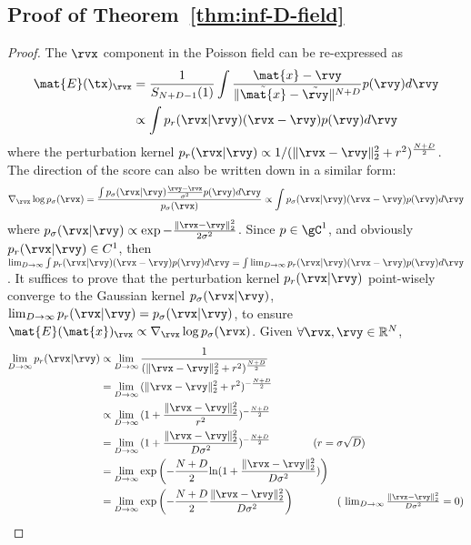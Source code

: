 \subsection{Proof of Theorem~\ref{thm:inf-D-field}}
\label{app:proof-thmfield}
\thmfield*
\begin{proof}
The $\rvx$ component in the Poisson field can be re-expressed as
\begin{align*}
    \mat{E}({\tx})_{\rvx} &= \frac{1}{S_{N+D-1}(1)}\int \frac{{\mat{x}}-{\rvy}}{\|\tilde{\mat{x}}-\tilde{\rvy}\|^{N+D}}{p}({\rvy}) d {\rvy} \\
    &\propto \int p_r(\rvx|\rvy)(\rvx-\rvy)p(\rvy)d\rvy
\end{align*}
 where the perturbation kernel $p_r({\rvx}|\rvy)  \propto  {1}/{({\|\rvx-{\rvy}\|_2^2+ r^2})^\frac{N+D}{2}}$. The direction of the score can also be written down in a similar form: 
 \begin{align*}
     \nabla_\rvx \log p_{\sigma}(\rvx)=\frac{\int p_\sigma(\rvx|\rvy)\frac{\rvy-\rvx}{\sigma^2}p(\rvy)d\rvy}{p_\sigma(\rvx)}\propto \int p_\sigma(\rvx|\rvy)(\rvx-\rvy)p(\rvy)d\rvy
 \end{align*}
where $ p_{\sigma}(\rvx|\rvy) \propto \exp-\frac{\|\rvx-{\rvy}\|_2^2}{ 2\sigma^2}$. Since $p\in \gC^1$, and obviously $p_r(\rvx|\rvy) \in C^1$, then $\lim_{D\to \infty}\int p_r(\rvx|\rvy)(\rvx-\rvy)p(\rvy)d\rvy=\int \lim_{D\to \infty}p_r(\rvx|\rvy)(\rvx-\rvy)p(\rvy)d\rvy$. It suffices to prove that the perturbation kernel $p_r({\rvx}|\rvy)$ point-wisely converge to the Gaussian kernel $p_{\sigma}(\rvx|\rvy)$, \ie $\lim_{D\to \infty}p_r({\rvx}|\rvy) = p_\sigma({\rvx}|\rvy) $, to ensure $\mat{E}({\mat{x}})_{\rvx} \propto \nabla_\rvx \log p_{\sigma}(\rvx)$. Given $\forall \rvx,\rvy \in \mathbb{R}^{N}$, 
\begin{align*}
    \lim_{D\to \infty}p_r({\rvx}|\rvy) &\propto \lim_{D\to \infty}\frac{1}{({\|\rvx-\rvy\|_2^2+ r^2})^\frac{N+D}{2}}\\
    &=\lim_{D\to \infty}{({\|\rvx-\rvy\|_2^2+ r^2})^{-\frac{N+D}{2}}}\\
    &\propto\lim_{D\to \infty}{({1+\frac{\|\rvx-\rvy\|_2^2}{ r^2}})^{-\frac{N+D}{2}}}\\
    &=\lim_{D\to \infty}{({1+\frac{\|\rvx-\rvy\|_2^2}{ D\sigma^2}})^{-\frac{N+D}{2}}}\qquad \tag{$r=\sigma\sqrt{D}$}\\
    &= \lim_{D\to \infty}\exp\left(-\frac{N+D}{2} {\rm ln}(1+\frac{\|\rvx-\rvy\|_2^2}{ D\sigma^2}) \right)\\
    &= \lim_{D\to \infty}\exp\left(-\frac{N+D}{2} \frac{\|\rvx-\rvy\|_2^2}{ D\sigma^2} \right) \qquad \tag{ $\lim_{D\to \infty}\frac{\|\rvx-\rvy\|_2^2}{D\sigma^2}= 0 $}\\

\end{align*}
\end{proof}

